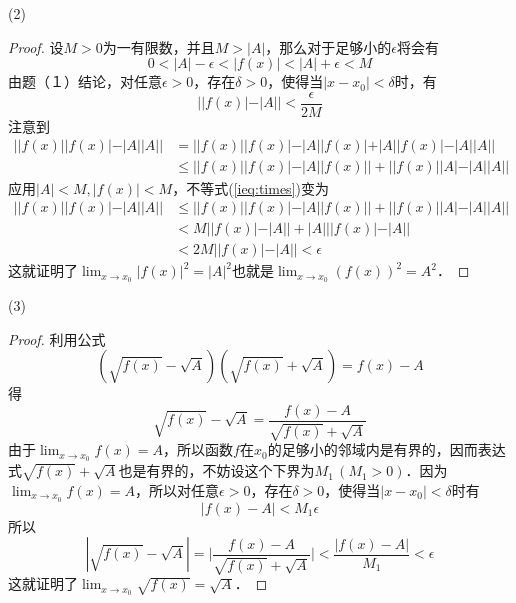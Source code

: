 (2)
\begin{proof}
设$M>0$为一有限数，并且$M>|A|$，那么对于足够小的$\epsilon$将会有
\begin{equation}
0 < |A| - \epsilon < |f(x)| < |A| + \epsilon < M
\end{equation}
由题（１）结论，对任意$\epsilon > 0$，存在$\delta > 0$，使得当$|x - x_0| < \delta$时，有
\begin{equation}
    ||f(x)|-|A||<\frac{\epsilon}{2M}
\end{equation}
注意到
\begin{align}
    ||f(x)||f(x)|-|A||A|| &= ||f(x)||f(x)| - |A||f(x)| + |A||f(x)| - |A||A|| \\
    &\leq ||f(x)||f(x)| - |A||f(x)|| + ||f(x)||A|-|A||A|| \label{ieq:times}
\end{align}
应用$|A| < M, |f(x)| < M$，不等式(\ref{ieq:times})变为
\begin{align}
    ||f(x)||f(x)|-|A||A|| &\leq ||f(x)||f(x)| - |A||f(x)|| + ||f(x)||A|-|A||A|| \\
    &< M||f(x)|-|A|| + |A|||f(x)|-|A|| \\
    &<2M||f(x)|-|A|| < \epsilon
\end{align}
这就证明了$\displaystyle\lim_{x \to x_0} |f(x)|^2 = |A|^2$也就是$\displaystyle\lim_{x \to x_0} (f(x))^2 = A^2$．
\end{proof}

(3)
\begin{proof}
利用公式
\begin{equation}
    (\sqrt{f(x)}-\sqrt{A})(\sqrt{f(x)}+\sqrt{A})=f(x)-A
\end{equation}
得
\begin{equation}
    \sqrt{f(x)}-\sqrt{A} = \frac{f(x)-A}{\sqrt{f(x)}+\sqrt{A}}
\end{equation}
由于$\displaystyle\lim_{x \to x_0} f(x) = A$，所以函数$f$在$x_0$的足够小的邻域内是有界的，因而表达式$\sqrt{f(x)}+\sqrt{A}$也是有界的，不妨设这个下界为$M_1 \, (M_1 > 0)$．因为$\displaystyle\lim_{x \to x_0} f(x) = A$，所以对任意$\epsilon > 0$，存在$\delta > 0$，使得当$|x - x_0| < \delta$时有
\begin{equation}
    |f(x)-A|<M_1\epsilon
\end{equation}
所以
\begin{equation}
    |\sqrt{f(x)}-\sqrt{A}|=\bigg\lvert \frac{f(x)-A}{\sqrt{f(x)}+\sqrt{A}} \bigg\rvert < \frac{|f(x)-A|}{M_1} < \epsilon
\end{equation}
这就证明了$\displaystyle\lim_{x \to x_0} \sqrt{f(x)} = \sqrt{A}$．
\end{proof}

